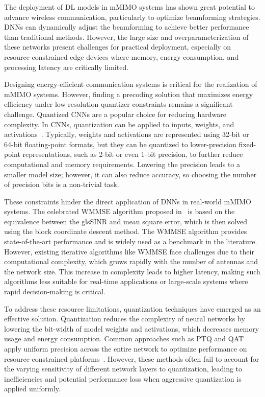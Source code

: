 The deployment of \gls{DL} models in \gls{mMIMO} systems has shown great potential to advance wireless communication, particularly to optimize beamforming strategies. \Gls{DNN}s can dynamically adjust the beamforming to achieve better performance than traditional methods. However, the large size and overparameterization of these networks present challenges for practical deployment, especially on resource-constrained edge devices where memory, energy consumption, and processing latency are critically limited.

Designing energy-efficient communication systems is critical for the realization of \gls{mMIMO} systems. However, finding a precoding solution that maximizes energy efficiency under low-resolution quantizer constraints remains a significant challenge\cite{choi2022energy}. Quantized \glspl{CNN} are a popular choice for reducing hardware complexity. In \glspl{CNN}, quantization can be applied to inputs, weights, and activations~\cite{9150443}. Typically, weights and activations are represented using 32-bit or 64-bit floating-point formats, but they can be quantized to lower-precision fixed-point representations, such as 2-bit or even 1-bit precision, to further reduce computational and memory requirements. Lowering the precision leads to a smaller model size; however, it can also reduce accuracy, so choosing the number of precision bits is a non-trivial task.

These constraints hinder the direct application of DNNs in real-world mMIMO systems.
The celebrated \gls{WMMSE} algorithm proposed in~\cite{shi2011iteratively} is based on the equivalence between the gls{SINR} and mean square error, which is then solved using the block coordinate descent method. The WMMSE algorithm provides state-of-the-art performance and is widely used as a benchmark in the literature. However, existing iterative algorithms like WMMSE face challenges due to their computational complexity, which grows rapidly with the number of antennas and the network size. This increase in complexity leads to higher latency, making such algorithms less suitable for real-time applications or large-scale systems where rapid decision-making is critical.

To address these resource limitations, quantization techniques have emerged as an effective solution. Quantization reduces the complexity of neural networks by lowering the bit-width of model weights and activations, which decreases memory usage and energy consumption. Common approaches such as \gls{PTQ} and \gls{QAT} apply uniform precision across the entire network to optimize performance on resource-constrained platforms~\cite{720541, DBLP:journals/corr/HanMD15}. However, these methods often fail to account for the varying sensitivity of different network layers to quantization, leading to inefficiencies and potential performance loss when aggressive quantization is applied uniformly.


